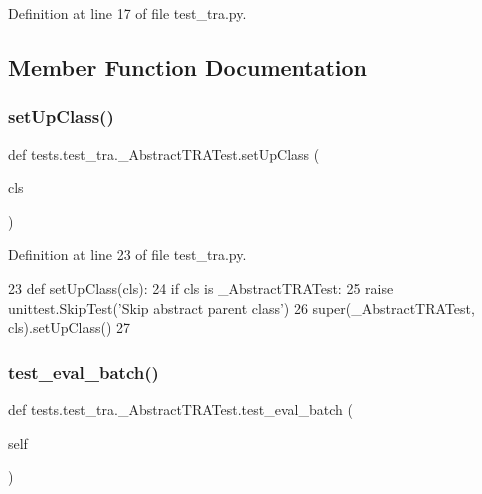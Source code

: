 Definition at line 17 of file test\+\_\+tra.\+py.



\subsection{Member Function Documentation}
\mbox{\label{classtests_1_1test__tra_1_1__AbstractTRATest_ade44250f8726cfdc9e77fa23b18bfb01}} 
\subsubsection{\texorpdfstring{set\+Up\+Class()}{setUpClass()}}
{\footnotesize\ttfamily def tests.\+test\+\_\+tra.\+\_\+\+Abstract\+T\+R\+A\+Test.\+set\+Up\+Class (\begin{DoxyParamCaption}\item[{}]{cls }\end{DoxyParamCaption})}



Definition at line 23 of file test\+\_\+tra.\+py.


\begin{DoxyCode}
23     \textcolor{keyword}{def }setUpClass(cls):
24         \textcolor{keywordflow}{if} cls \textcolor{keywordflow}{is} \_AbstractTRATest:
25             \textcolor{keywordflow}{raise} unittest.SkipTest(\textcolor{stringliteral}{'Skip abstract parent class'})
26         super(\_AbstractTRATest, cls).setUpClass()
27 
\end{DoxyCode}
\mbox{\label{classtests_1_1test__tra_1_1__AbstractTRATest_a4ba4e6e2822503780f927c9916e3ae55}} 
\subsubsection{\texorpdfstring{test\+\_\+eval\+\_\+batch()}{test\_eval\_batch()}}
{\footnotesize\ttfamily def tests.\+test\+\_\+tra.\+\_\+\+Abstract\+T\+R\+A\+Test.\+test\+\_\+eval\+\_\+batch (\begin{DoxyParamCaption}\item[{}]{self }\end{DoxyParamCaption})}



